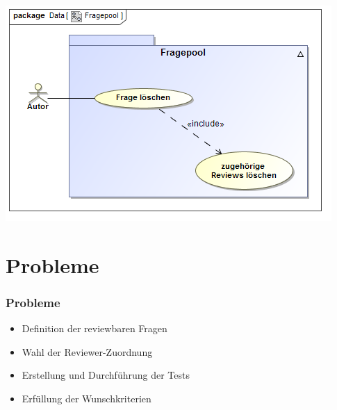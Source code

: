\documentclass{beamer}
\begin{document}
		\begin{frame}
			\begin{center}
				\includegraphics[scale=0.5]{Diagramme/Use_Case_Diagram__Fragepool.png}
				\label{Fragepool}
			\end{center}
		\end{frame}
	\section{Probleme}
		\begin{frame}
			\frametitle{Probleme}
    		\begin{itemize}
		    	\item Definition der reviewbaren Fragen
		    	\pause
    			\item Wahl der Reviewer-Zuordnung
    			\pause
    			\item Erstellung und Durchführung der Tests
    			\pause
    			\item Erfüllung der Wunschkriterien
    		\end{itemize}
		\end{frame}
\end{document}
